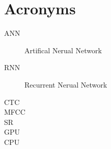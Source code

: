 \chapter{Acronyms}
\begin{description}
	\item[ANN] Artifical Nerual Network
	\item[RNN] Recurrent Nerual Network
	\item[CTC]
	\item[MFCC]
	\item[SR]
	\item[GPU]
	\item[CPU]
\end{description}
